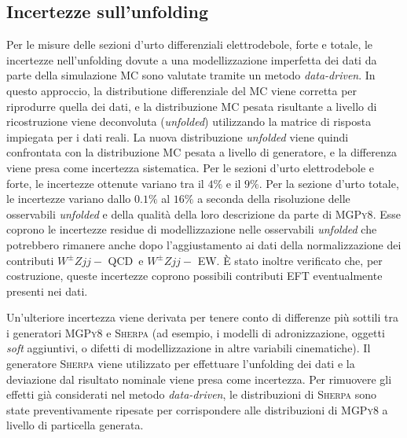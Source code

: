 \documentclass[11pt]{article}
\newcommand{\wzjjew}{$W^\pm Z jj-$ EW}
\newcommand{\wzjjqcd}{$W^\pm Z jj-$ QCD}
\begin{document}
\subsection{Incertezze sull'unfolding}
Per le misure delle sezioni d'urto differenziali elettrodebole, forte e totale, le incertezze nell'unfolding dovute a una modellizzazione imperfetta dei dati da parte della simulazione MC sono valutate tramite un metodo \textit{data-driven}. In questo approccio, la distributione differenziale del MC viene corretta per riprodurre quella dei dati, e la distribuzione MC pesata risultante a livello di ricostruzione viene deconvoluta (\textit{unfolded}) utilizzando la matrice di risposta impiegata per i dati reali. La nuova distribuzione \textit{unfolded} viene quindi confrontata con la distribuzione MC pesata a livello di generatore, e la differenza viene presa come incertezza sistematica. Per le sezioni d'urto elettrodebole e forte, le incertezze ottenute variano tra il $4\%$ e il $9\%$. Per la sezione d'urto totale, le incertezze variano dallo $0.1\%$ al $16\%$ a seconda della risoluzione delle osservabili \textit{unfolded} e della qualità della loro descrizione da parte di \textsc{MGPy8}. Esse coprono le incertezze residue di modellizzazione nelle osservabili \textit{unfolded} che potrebbero rimanere anche dopo l'aggiustamento ai dati della normalizzazione dei contributi \wzjjqcd\ e \wzjjew. È stato inoltre verificato che, per costruzione, queste incertezze coprono possibili contributi EFT eventualmente presenti nei dati. 

Un'ulteriore incertezza viene derivata per tenere conto di differenze più sottili tra i generatori \textsc{MGPy8} e \textsc{Sherpa} (ad esempio, i modelli di adronizzazione, oggetti \textit{soft} aggiuntivi, o difetti di modellizzazione in altre variabili cinematiche). Il generatore \textsc{Sherpa} viene utilizzato per effettuare l'unfolding dei dati e la deviazione dal risultato nominale viene presa come incertezza. Per rimuovere gli effetti già considerati nel metodo \textit{data-driven}, le distribuzioni di \textsc{Sherpa} sono state preventivamente ripesate per corrispondere alle distribuzioni di \textsc{MGPy8} a livello di particella generata.
\end{document}
